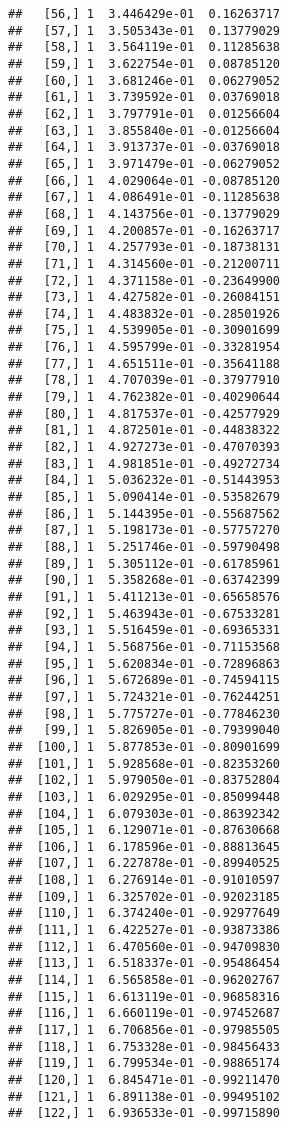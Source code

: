 \documentclass[
  12pt,
]{article}
\begin{document}
\begin{verbatim}
##   [56,] 1  3.446429e-01  0.16263717
##   [57,] 1  3.505343e-01  0.13779029
##   [58,] 1  3.564119e-01  0.11285638
##   [59,] 1  3.622754e-01  0.08785120
##   [60,] 1  3.681246e-01  0.06279052
##   [61,] 1  3.739592e-01  0.03769018
##   [62,] 1  3.797791e-01  0.01256604
##   [63,] 1  3.855840e-01 -0.01256604
##   [64,] 1  3.913737e-01 -0.03769018
##   [65,] 1  3.971479e-01 -0.06279052
##   [66,] 1  4.029064e-01 -0.08785120
##   [67,] 1  4.086491e-01 -0.11285638
##   [68,] 1  4.143756e-01 -0.13779029
##   [69,] 1  4.200857e-01 -0.16263717
##   [70,] 1  4.257793e-01 -0.18738131
##   [71,] 1  4.314560e-01 -0.21200711
##   [72,] 1  4.371158e-01 -0.23649900
##   [73,] 1  4.427582e-01 -0.26084151
##   [74,] 1  4.483832e-01 -0.28501926
##   [75,] 1  4.539905e-01 -0.30901699
##   [76,] 1  4.595799e-01 -0.33281954
##   [77,] 1  4.651511e-01 -0.35641188
##   [78,] 1  4.707039e-01 -0.37977910
##   [79,] 1  4.762382e-01 -0.40290644
##   [80,] 1  4.817537e-01 -0.42577929
##   [81,] 1  4.872501e-01 -0.44838322
##   [82,] 1  4.927273e-01 -0.47070393
##   [83,] 1  4.981851e-01 -0.49272734
##   [84,] 1  5.036232e-01 -0.51443953
##   [85,] 1  5.090414e-01 -0.53582679
##   [86,] 1  5.144395e-01 -0.55687562
##   [87,] 1  5.198173e-01 -0.57757270
##   [88,] 1  5.251746e-01 -0.59790498
##   [89,] 1  5.305112e-01 -0.61785961
##   [90,] 1  5.358268e-01 -0.63742399
##   [91,] 1  5.411213e-01 -0.65658576
##   [92,] 1  5.463943e-01 -0.67533281
##   [93,] 1  5.516459e-01 -0.69365331
##   [94,] 1  5.568756e-01 -0.71153568
##   [95,] 1  5.620834e-01 -0.72896863
##   [96,] 1  5.672689e-01 -0.74594115
##   [97,] 1  5.724321e-01 -0.76244251
##   [98,] 1  5.775727e-01 -0.77846230
##   [99,] 1  5.826905e-01 -0.79399040
##  [100,] 1  5.877853e-01 -0.80901699
##  [101,] 1  5.928568e-01 -0.82353260
##  [102,] 1  5.979050e-01 -0.83752804
##  [103,] 1  6.029295e-01 -0.85099448
##  [104,] 1  6.079303e-01 -0.86392342
##  [105,] 1  6.129071e-01 -0.87630668
##  [106,] 1  6.178596e-01 -0.88813645
##  [107,] 1  6.227878e-01 -0.89940525
##  [108,] 1  6.276914e-01 -0.91010597
##  [109,] 1  6.325702e-01 -0.92023185
##  [110,] 1  6.374240e-01 -0.92977649
##  [111,] 1  6.422527e-01 -0.93873386
##  [112,] 1  6.470560e-01 -0.94709830
##  [113,] 1  6.518337e-01 -0.95486454
##  [114,] 1  6.565858e-01 -0.96202767
##  [115,] 1  6.613119e-01 -0.96858316
##  [116,] 1  6.660119e-01 -0.97452687
##  [117,] 1  6.706856e-01 -0.97985505
##  [118,] 1  6.753328e-01 -0.98456433
##  [119,] 1  6.799534e-01 -0.98865174
##  [120,] 1  6.845471e-01 -0.99211470
##  [121,] 1  6.891138e-01 -0.99495102
##  [122,] 1  6.936533e-01 -0.99715890

\end{verbatim}
\end{document}
